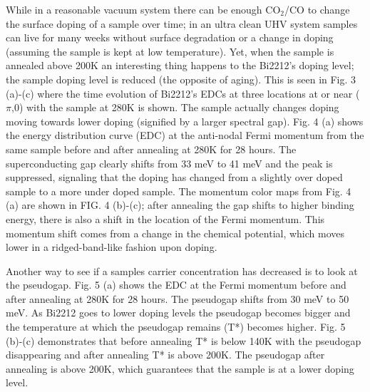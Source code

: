 \documentclass[aps,twocolumn,amsmath,amssymb,showpacs,prb,
superscriptaddress,unsortedaddress]{revtex4}
\begin{document}
While in a reasonable vacuum system there can be enough CO$_2$/CO to
change the surface doping of a sample over time; in an ultra clean UHV
system samples can live for many weeks without surface degradation or
a change in doping (assuming the sample is kept at low temperature). 
Yet, when the sample is annealed above 200K an interesting thing
happens to the Bi2212's doping level; the sample doping level is
reduced (the opposite of aging).  This is seen in Fig. 3 (a)-(c) where
the time evolution of Bi2212's EDCs at three locations at or near
($\pi$,0) with the sample at 280K is shown.  The sample actually
changes doping moving towards lower doping (signified by a larger
spectral gap). Fig. 4 (a) shows the energy distribution curve (EDC) at
the anti-nodal Fermi momentum from the same sample before and after
annealing at 280K for 28 hours.  The superconducting gap clearly
shifts from 33 meV to 41 meV and the peak is suppressed, signaling
that the doping has changed from a slightly over doped sample to a
more under doped sample\cite{T. Sato 2001}.   The momentum color maps
from Fig. 4 (a) are shown in FIG. 4 (b)-(c); after annealing the gap
shifts to higher binding energy, there is also a shift in the location
of the Fermi momentum.  This momentum shift comes from a change in the
chemical potential, which moves lower in a ridged-band-like fashion
upon doping.\cite{M. Hashimoto 2008}






Another way to see if a samples carrier concentration has decreased is
to look at the pseudogap.  Fig. 5 (a) shows the EDC at the Fermi
momentum before and after annealing at 280K for 28 hours.  The
pseudogap shifts from 30 meV to 50 meV.  As Bi2212 goes to lower
doping levels the pseudogap becomes bigger and the temperature at
which the pseudogap remains (T*) becomes higher\cite{H. Ding 1996}.
Fig. 5 (b)-(c) demonstrates that before annealing T* is below 140K
with the pseudogap disappearing and after annealing T* is above 200K. 
The pseudogap after annealing is above 200K, which guarantees that the
sample is at a lower doping level.
\end{document}
